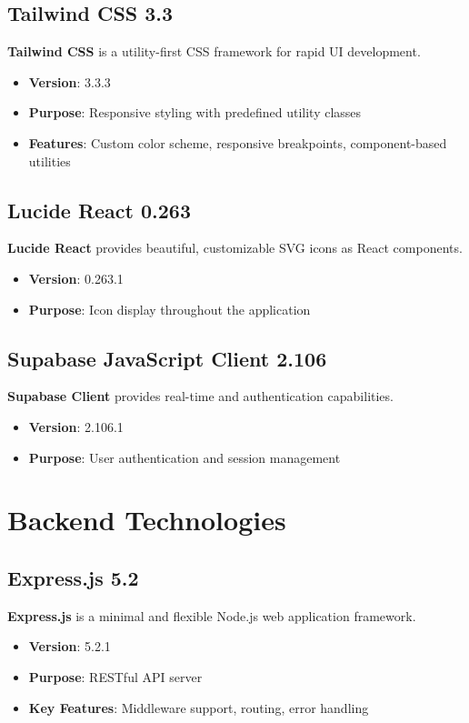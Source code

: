 \documentclass[12pt,a4paper]{report}
\begin{document}
\subsection{Tailwind CSS 3.3}
\textbf{Tailwind CSS} is a utility-first CSS framework for rapid UI development.
\begin{itemize}
    \item \textbf{Version}: 3.3.3
    \item \textbf{Purpose}: Responsive styling with predefined utility classes
    \item \textbf{Features}: Custom color scheme, responsive breakpoints, component-based utilities
\end{itemize}

\subsection{Lucide React 0.263}
\textbf{Lucide React} provides beautiful, customizable SVG icons as React components.
\begin{itemize}
    \item \textbf{Version}: 0.263.1
    \item \textbf{Purpose}: Icon display throughout the application
\end{itemize}

\subsection{Supabase JavaScript Client 2.106}
\textbf{Supabase Client} provides real-time and authentication capabilities.
\begin{itemize}
    \item \textbf{Version}: 2.106.1
    \item \textbf{Purpose}: User authentication and session management
\end{itemize}

\section{Backend Technologies}

\subsection{Express.js 5.2}
\textbf{Express.js} is a minimal and flexible Node.js web application framework.
\begin{itemize}
    \item \textbf{Version}: 5.2.1
    \item \textbf{Purpose}: RESTful API server
    \item \textbf{Key Features}: Middleware support, routing, error handling
\end{itemize}
\end{document}
